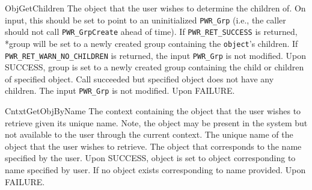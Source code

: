 \begin{prototype}{ObjGetChildren}
		{\pInput}	{The object that the user wishes to determine the children of.}
		{\pOutput}	{On input, this should be set to point to an uninitialized \texttt{PWR_Grp} (i.e., the caller should not call \texttt{PWR_GrpCreate} ahead of time).  If \texttt{PWR_RET_SUCCESS} is returned, *group will be set to a newly created group containing the \texttt{object}'s children.  If \texttt{PWR_RET_WARN_NO_CHILDREN} is returned, the input \texttt{PWR_Grp} is not modified.}
	          		{Upon SUCCESS, group is set to a newly created group containing the child or children of specified object.}
	 		{Call succeeded but specified object does not have any children. The input \texttt{PWR_Grp} is not modified.}
	          		{Upon FAILURE.}
\end{prototype}

\begin{prototype}{CntxtGetObjByName}
		{\pInput}{The context containing the object that the user wishes to retrieve given its unique name. Note, the object may be present in the system but not available to the user through the current context.}
		{\pInput}{The unique name of the object that the user wishes to retrieve.}
		{\pOutput}{The object that corresponds to the name specified by the user.}
	             	{Upon SUCCESS, object is set to object corresponding to name specified by user.}
	 	{If no object exists corresponding to name provided.}
	             	{Upon FAILURE.}
\end{prototype}

